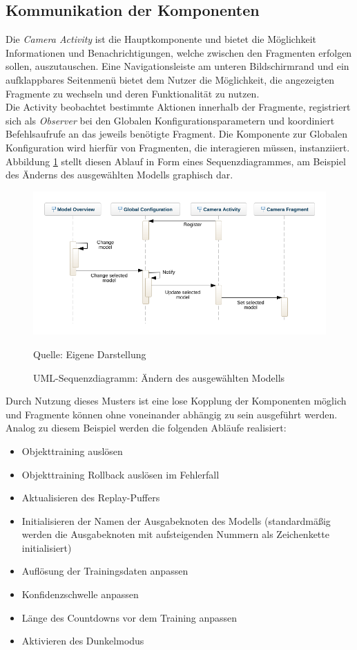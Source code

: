 \documentclass[oneside]{ausarbeitung}
\begin{document}
\subsection{Kommunikation der Komponenten}
\label{cha:communication-components}
Die \textit{Camera Activity} ist die Hauptkomponente und bietet die Möglichkeit Informationen und Benachrichtigungen, welche zwischen den Fragmenten erfolgen sollen, auszutauschen. Eine Navigationsleiste am unteren Bildschirmrand und ein aufklappbares Seitenmenü bietet dem Nutzer die Möglichkeit, die angezeigten Fragmente zu wechseln und deren Funktionalität zu nutzen.\\
Die Activity beobachtet bestimmte Aktionen innerhalb der Fragmente, registriert sich als \textit{Observer} bei den Globalen Konfigurationsparametern und koordiniert Befehlsaufrufe an das jeweils benötigte Fragment. Die Komponente zur Globalen Konfiguration wird hierfür von Fragmenten, die interagieren müssen, instanziiert.\\
Abbildung \ref{fig:sequence-diagram-change-model} stellt diesen  Ablauf in Form eines Sequenzdiagrammes, am Beispiel des Änderns des ausgewählten Modells graphisch dar. 

\begin{figure}[hptb]
	\centering
	\includegraphics[height=0.35\textheight]{images/sequence-diagram-change-model.png}
	\caption{UML-Sequenzdiagramm: Ändern des ausgewählten Modells} Quelle: Eigene Darstellung
	\label{fig:sequence-diagram-change-model}
\end{figure}

Durch Nutzung dieses Musters ist eine lose Kopplung der Komponenten möglich und Fragmente können ohne voneinander abhängig zu sein ausgeführt werden. Analog zu diesem Beispiel werden die folgenden Abläufe realisiert:
\begin{itemize}
	\item Objekttraining auslösen
	\item Objekttraining Rollback auslösen im Fehlerfall
	\item Aktualisieren des Replay-Puffers
	\item Initialisieren der Namen der Ausgabeknoten des Modells (standardmäßig werden die Ausgabeknoten mit aufsteigenden Nummern als Zeichenkette initialisiert)
	\item Auflösung der Trainingsdaten anpassen
	\item Konfidenzschwelle anpassen
	\item Länge des Countdowns vor dem Training anpassen
	\item Aktivieren des Dunkelmodus
\end{itemize}
\end{document}

